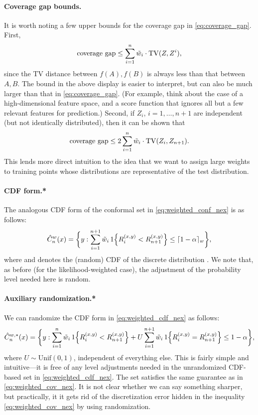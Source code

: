 \documentclass{article}
\begin{document}
\paragraph{Coverage gap bounds.}

It is worth noting a few upper bounds for the coverage gap in
\eqref{eq:coverage_gap}. First, 
\[
\text{coverage gap} \leq \sum_{i=1}^n \tilde{w}_i \cdot \mathrm{TV}(Z, Z^i),
\]
since the TV distance between $f(A),f(B)$ is always less than that between
$A,B$. The bound in the above display is easier to interpret, but can also be
much larger than that in \eqref{eq:coverage_gap}. (For example, think about the
case of a high-dimensional feature space, and a score function that ignores all
but a few relevant features for prediction.) Second, if $Z_i$, $i=1,\dots,n+1$
are independent (but not identically distributed), then it can be shown that 
\[
\text{coverage gap} \leq 2\sum_{i=1}^n \tilde{w}_i \cdot \mathrm{TV}(Z_i, Z_{n+1}).
\]
This lends more direct intuition to the idea that we want to assign large
weights to training points whose distributions are representative of the test 
distribution. 

\paragraph{CDF form.*}

The analogous CDF form of the conformal set in \eqref{eq:weighted_conf_nex} is
as follows: 
\begin{equation}
\label{eq:weighted_cdf_nex}
\hat{C}^w_n(x) = \bigg\{ y : \sum_{i=1}^{n+1} \tilde{w}_i \, 1\Big\{ R_i^{(x,y)} <
R^{(x,y)}_{n+1} \Big\} \leq \lceil 1-\alpha \rceil_w \bigg\}, 
\end{equation}
where  and  denotes the (random) CDF of the
discrete distribution . We note that, as before (for the
likelihood-weighted case), the adjustment of the probability level needed here
is random.  

\paragraph{Auxiliary randomization.*}

We can randomize the CDF form in \eqref{eq:weighted_cdf_nex} as follows: 
\[
\hat{C}_n^{w,*}(x) = \bigg\{ y : \sum_{i=1}^n \tilde{w}_i \, 1\Big\{ R_i^{(x,y)} <
R^{(x,y)}_{n+1} \Big\} + U \sum_{i=1}^{n+1} \tilde{w}_i \, 1\Big\{ R_i^{(x,y)} =
R^{(x,y)}_{n+1} \Big\} \leq 1-\alpha \bigg\},
\]
where $U \sim \mathrm{Unif}(0,1)$, independent of everything else. This is
fairly simple and intuitive---it is free of any level adjustments needed in the   
unrandomized CDF-based set in \eqref{eq:weighted_cdf_nex}. The set
 satisfies the same guarantee as in
\eqref{eq:weighted_cov_nex}. It is not clear whether we can say something
sharper, but practically, it it gets rid of the discretization error hidden in 
the inequality \eqref{eq:weighted_cov_nex} by using randomization. 
\end{document}
